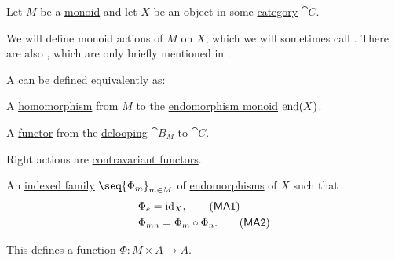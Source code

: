\begin{definition}\label{def:monoid_action}
  Let \( M \) be a \hyperref[def:monoid]{monoid} and let \( X \) be an object in some \hyperref[def:category]{category} \( \cat{C} \).

  We will define monoid actions of \( M \) on \( X \), which we will sometimes call . There are also , which are only briefly mentioned in .

  A  can be defined equivalently as:
  \begin{thmenum}
     A \hyperref[def:monoid/homomorphism]{homomorphism} from \( M \) to the \hyperref[def:endomorphism_monoid]{endomorphism monoid} \( \operatorname{end}(X) \).

     A \hyperref[def:functor]{functor} from the \hyperref[def:monoid_delooping]{delooping} \( \cat{B}_M \) to \( \cat{C} \).

    Right actions are \hyperref[rem:contravariant_functor]{contravariant functors}.

     An \hyperref[def:cartesian_product/indexed_family]{indexed family} \( \seq{ \Phi_m }_{m \in M} \) of \hyperref[def:morphism_invertibility/endomorphism]{endomorphisms} of \( X \) such that
    \begin{align}
      &\Phi_e = \id_X, \label{eq:def:monoid_action/family/identity}\tag{\logic{MA1}} \\
      &\Phi_{mn} = \Phi_m \bincirc \Phi_n. \label{eq:def:monoid_action/family/compatibility}\tag{\logic{MA2}}
    \end{align}

    This defines a function \( \Phi: M \times A \to A \).
  \end{thmenum}
\end{definition}
